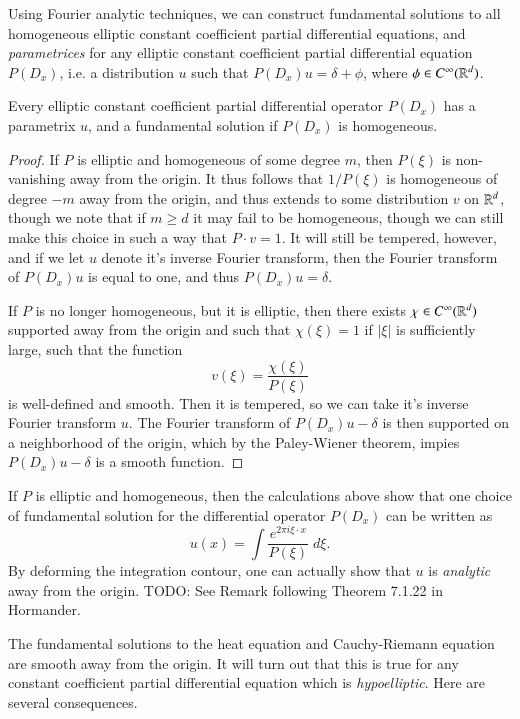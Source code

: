 Using Fourier analytic techniques, we can construct fundamental solutions to all homogeneous elliptic constant coefficient partial differential equations, and \emph{parametrices} for any elliptic constant coefficient partial differential equation $P(D_x)$, i.e. a distribution $u$ such that $P(D_x) u = \delta + \phi$, where $\phi \in C^\infty(\operatorname{\mathbb{R}}^d)$.

\begin{theorem}
    Every elliptic constant coefficient partial differential operator $P(D_x)$ has a parametrix $u$, and a fundamental solution if $P(D_x)$ is homogeneous.
\end{theorem}
\begin{proof}
    If $P$ is elliptic and homogeneous of some degree $m$, then $P(\xi)$ is non-vanishing away from the origin. It thus follows that $1/P(\xi)$ is homogeneous of degree $-m$ away from the origin, and thus extends to some distribution $v$ on $\operatorname{\mathbb{R}}^d$, though we note that if $m \geq d$ it may fail to be homogeneous, though we can still make this choice in such a way that $P \cdot v = 1$. It will still be tempered, however, and if we let $u$ denote it's inverse Fourier transform, then the Fourier transform of $P(D_x) u$ is equal to one, and thus $P(D_x) u = \delta$.

    If $P$ is no longer homogeneous, but it is elliptic, then there exists $\chi \in C^\infty(\operatorname{\mathbb{R}}^d)$ supported away from the origin and such that $\chi(\xi) = 1$ if $|\xi|$ is sufficiently large, such that the function
    \[ v(\xi) = \frac{\chi(\xi)}{P(\xi)} \]
    is well-defined and smooth. Then it is tempered, so we can take it's inverse Fourier transform $u$. The Fourier transform of $P(D_x) u - \delta$ is then supported on a neighborhood of the origin, which by the Paley-Wiener theorem, impies $P(D_x) u - \delta$ is a smooth function.
\end{proof}

If $P$ is elliptic and homogeneous, then the calculations above show that one choice of fundamental solution for the differential operator $P(D_x)$ can be written as
%
\[ u(x) = \int \frac{e^{2 \pi i \xi \cdot x}}{P(\xi)}\; d\xi. \]
%
By deforming the integration contour, one can actually show that $u$ is \emph{analytic} away from the origin. TODO: See Remark following Theorem 7.1.22 in Hormander.

The fundamental solutions to the heat equation and Cauchy-Riemann equation are smooth away from the origin. It will turn out that this is true for any constant coefficient partial differential equation which is \emph{hypoelliptic}. Here are several consequences.

